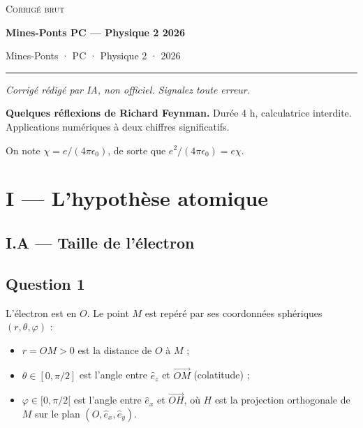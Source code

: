 \documentclass[11pt,a4paper]{article}
\providecommand{\tightlist}{\setlength{\itemsep}{0pt}\setlength{\parskip}{0pt}}
\begin{document}
\thispagestyle{plain}
\begin{center}
  {\small\scshape Corrigé brut}\par\smallskip
  {\LARGE\bfseries Mines-Ponts PC — Physique 2 2026\par}\medskip
  {\large Mines-Ponts · PC · Physique 2 · 2026\par}
\end{center}
\vspace{2pt}\hrule\vspace{8pt}

\emph{Corrigé rédigé par IA, non officiel. Signalez toute erreur.}

\textbf{Quelques réflexions de Richard Feynman.} Durée 4 h, calculatrice interdite. Applications numériques à deux chiffres significatifs.

On note \(\chi=e/(4\pi\epsilon_0)\), de sorte que \(e^2/(4\pi\epsilon_0)=e\chi\).

\hypertarget{i-lhypothuxe8se-atomique}{%
\section{I --- L'hypothèse atomique}\label{i-lhypothuxe8se-atomique}}

\hypertarget{i.a-taille-de-luxe9lectron}{%
\subsection{I.A --- Taille de l'électron}\label{i.a-taille-de-luxe9lectron}}

\hypertarget{question-1}{%
\subsection{Question 1}\label{question-1}}

L'électron est en \(O\). Le point \(M\) est repéré par ses coordonnées sphériques \((r,\theta,\varphi)\) :

\begin{itemize}
\tightlist
\item
  \(r=OM>0\) est la distance de \(O\) à \(M\) ;
\item
  \(\theta\in[0,\pi/2]\) est l'angle entre \(\hat e_z\) et \(\overrightarrow{OM}\) (colatitude) ;
\item
  \(\varphi\in[0,\pi/2[\) est l'angle entre \(\hat e_x\) et \(\overrightarrow{OH}\), où \(H\) est la projection orthogonale de \(M\) sur le plan \((O,\hat e_x,\hat e_y)\).
\end{itemize}
\end{document}
